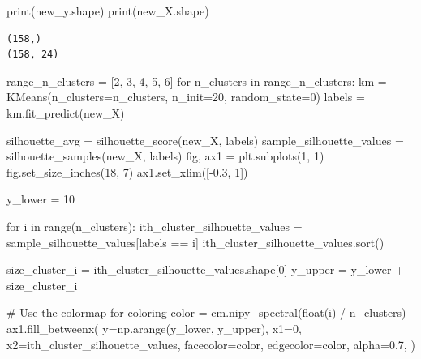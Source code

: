 \documentclass[
  11pt,
  letterpaper,
  DIV=11,
  numbers=noendperiod]{scrartcl}
\newenvironment{Shaded}{\begin{snugshade}}{\end{snugshade}}
\newcommand{\BuiltInTok}[1]{\textcolor[rgb]{0.00,0.23,0.31}{#1}}
\newcommand{\CommentTok}[1]{\textcolor[rgb]{0.37,0.37,0.37}{#1}}
\newcommand{\ControlFlowTok}[1]{\textcolor[rgb]{0.00,0.23,0.31}{#1}}
\newcommand{\DecValTok}[1]{\textcolor[rgb]{0.68,0.00,0.00}{#1}}
\newcommand{\FloatTok}[1]{\textcolor[rgb]{0.68,0.00,0.00}{#1}}
\newcommand{\KeywordTok}[1]{\textcolor[rgb]{0.00,0.23,0.31}{#1}}
\newcommand{\NormalTok}[1]{\textcolor[rgb]{0.00,0.23,0.31}{#1}}
\newcommand{\OperatorTok}[1]{\textcolor[rgb]{0.37,0.37,0.37}{#1}}
\begin{document}
\begin{Shaded}
\begin{Highlighting}[]
\BuiltInTok{print}\NormalTok{(new\_y.shape)}
\BuiltInTok{print}\NormalTok{(new\_X.shape)}
\end{Highlighting}
\end{Shaded}

\begin{verbatim}
(158,)
(158, 24)
\end{verbatim}

\begin{Shaded}
\begin{Highlighting}[]
\NormalTok{range\_n\_clusters }\OperatorTok{=}\NormalTok{ [}\DecValTok{2}\NormalTok{, }\DecValTok{3}\NormalTok{, }\DecValTok{4}\NormalTok{, }\DecValTok{5}\NormalTok{, }\DecValTok{6}\NormalTok{]}
\ControlFlowTok{for}\NormalTok{ n\_clusters }\KeywordTok{in}\NormalTok{ range\_n\_clusters:}
\NormalTok{    km }\OperatorTok{=}\NormalTok{ KMeans(n\_clusters}\OperatorTok{=}\NormalTok{n\_clusters, n\_init}\OperatorTok{=}\DecValTok{20}\NormalTok{, random\_state}\OperatorTok{=}\DecValTok{0}\NormalTok{)}
\NormalTok{    labels }\OperatorTok{=}\NormalTok{ km.fit\_predict(new\_X)}
    
\NormalTok{    silhouette\_avg }\OperatorTok{=}\NormalTok{ silhouette\_score(new\_X, labels)}
\NormalTok{    sample\_silhouette\_values }\OperatorTok{=}\NormalTok{ silhouette\_samples(new\_X, labels)}
\NormalTok{    fig, ax1 }\OperatorTok{=}\NormalTok{ plt.subplots(}\DecValTok{1}\NormalTok{, }\DecValTok{1}\NormalTok{)}
\NormalTok{    fig.set\_size\_inches(}\DecValTok{18}\NormalTok{, }\DecValTok{7}\NormalTok{)}
\NormalTok{    ax1.set\_xlim([}\OperatorTok{{-}}\FloatTok{0.3}\NormalTok{, }\DecValTok{1}\NormalTok{])}

\NormalTok{    y\_lower }\OperatorTok{=} \DecValTok{10}
    
    \ControlFlowTok{for}\NormalTok{ i }\KeywordTok{in} \BuiltInTok{range}\NormalTok{(n\_clusters):}
\NormalTok{        ith\_cluster\_silhouette\_values }\OperatorTok{=}\NormalTok{ sample\_silhouette\_values[labels }\OperatorTok{==}\NormalTok{ i]}
\NormalTok{        ith\_cluster\_silhouette\_values.sort()}

\NormalTok{        size\_cluster\_i }\OperatorTok{=}\NormalTok{ ith\_cluster\_silhouette\_values.shape[}\DecValTok{0}\NormalTok{]}
\NormalTok{        y\_upper }\OperatorTok{=}\NormalTok{ y\_lower }\OperatorTok{+}\NormalTok{ size\_cluster\_i}

        \CommentTok{\# Use the colormap for coloring}
\NormalTok{        color }\OperatorTok{=}\NormalTok{ cm.nipy\_spectral(}\BuiltInTok{float}\NormalTok{(i) }\OperatorTok{/}\NormalTok{ n\_clusters)}
\NormalTok{        ax1.fill\_betweenx(}
\NormalTok{            y}\OperatorTok{=}\NormalTok{np.arange(y\_lower, y\_upper),}
\NormalTok{            x1}\OperatorTok{=}\DecValTok{0}\NormalTok{,}
\NormalTok{            x2}\OperatorTok{=}\NormalTok{ith\_cluster\_silhouette\_values,}
\NormalTok{            facecolor}\OperatorTok{=}\NormalTok{color,}
\NormalTok{            edgecolor}\OperatorTok{=}\NormalTok{color,}
\NormalTok{            alpha}\OperatorTok{=}\FloatTok{0.7}\NormalTok{,}
\NormalTok{        )}


\end{Highlighting}
\end{Shaded}
\end{document}
